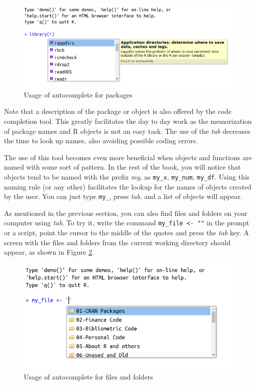 \documentclass[
  12pt,
]{book}
\begin{document}
\begin{figure}[!htbp]

{\centering \includegraphics[width=1\linewidth]{figs/autocomplete_packages} 

}

\caption{Usage of autocomplete for packages}\label{fig:autocomplete-packages}
\end{figure}

Note that a description of the package or object is also offered by the code completion tool. This greatly facilitates the day to day work as the memorization of package names and R objects is not an easy task. The use of the \emph{tab} decreases the time to look up names, also avoiding possible coding errors.

The use of this tool becomes even more beneficial when objects and functions are named with some sort of pattern. In the rest of the book, you will notice that objects tend to be named with the prefix \emph{my}, as \texttt{my\_x}, \texttt{my\_num}, \texttt{my\_df}. Using this naming rule (or any other) facilitates the lookup for the names of objects created by the user. You can just type \texttt{my\_}, press \emph{tab}, and a list of objects will appear.

As mentioned in the previous section, you can also find files and folders on your computer using \emph{tab}. To try it, write the command \texttt{my\_file\ \textless{}-\ ""} in the prompt or a script, point the cursor to the middle of the quotes and press the \emph{tab} key. A screen with the files and folders from the current working directory should appear, as shown in Figure \ref{fig:autocomplete-files}.

\begin{figure}[!htbp]

{\centering \includegraphics[width=1\linewidth]{figs/autocomplete_files} 

}

\caption{Usage of autocomplete for files and folders}\label{fig:autocomplete-files}
\end{figure}
\end{document}
